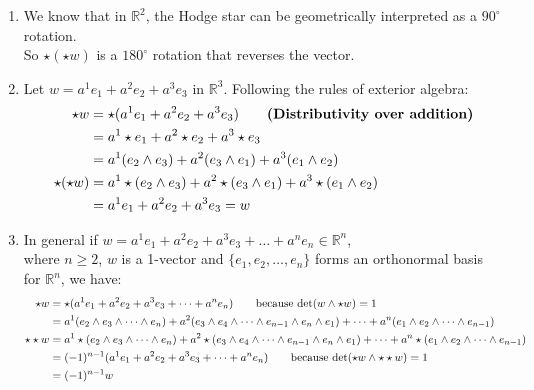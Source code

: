 \documentclass{article}
\begin{document}
\begin{enumerate}[label=(\alph*)]
    \item
    We know that in $\mathbb{R}^2$, the Hodge star can be geometrically interpreted as a $90^{\circ}$ rotation.\\
    So $\star(\star w)$ is a $180^{\circ}$ rotation that reverses the vector.

    \item
    Let $w=a^1e_1 + a^2e_2 + a^3e_3$ in $\mathbb{R}^3$. Following the rules of exterior algebra:
    \begin{align}
        \star w &= \star(a^1e_1 + a^2e_2 + a^3e_3) \tag*{\bfseries(Distributivity over addition)}\\
            &= a^1\star e_1 + a^2\star e_2 + a^3\star e_3 \notag\\
            &= a^1(e_2 \wedge e_3) + a^2(e_3 \wedge e_1) + a^3(e_1 \wedge e_2) \notag\\
        \star (\star w) &= a^1 \star(e_2 \wedge e_3) + a^2 \star(e_3 \wedge e_1) + a^3 \star(e_1 \wedge e_2) \notag\\
            &= a^1e_1 + a^2e_2 + a^3e_3 = w \notag
    \end{align}

    \item
    In general if $w=a^1e_1 + a^2e_2 + a^3e_3 + \dots + a^n e_n \in \mathbb{R}^n$,\\
    where $n \ge 2$, $w$ is a 1-vector and $\{e_1, e_2, \dots, e_n\}$ forms an orthonormal basis for $\mathbb{R}^n$, we have:
    \begin{align}
        \star w &= \star(a^1e_1 + a^2e_2 + a^3e_3 + \dots + a^n e_n) \tag*{because $\det(w \wedge \star w) = 1$}\\
                &=  a^1(e_2 \wedge e_3 \wedge \dots \wedge e_n)
                + a^2(e_3 \wedge e_4 \wedge \dots \wedge e_{n-1} \wedge e_n \wedge e_1)
                + \dots + a^n(e_1 \wedge e_2 \wedge \dots \wedge e_{n-1}) \notag\\
        \star\star w    &= a^1\star(e_2 \wedge e_3 \wedge \dots \wedge e_n)
        + a^2\star(e_3 \wedge e_4 \wedge \dots \wedge e_{n-1} \wedge e_n \wedge e_1)
        + \dots + a^n\star(e_1 \wedge e_2 \wedge \dots \wedge e_{n-1}) \notag\\ 
                &= (-1)^{n-1} (a^1e_1 + a^2e_2 + a^3e_3 + \dots + a^n e_n) \tag*{because $\det(\star w \wedge \star\star w) = 1$}\\
                &= (-1)^{n-1} w \notag
    \end{align}


\end{enumerate}
\end{document}
